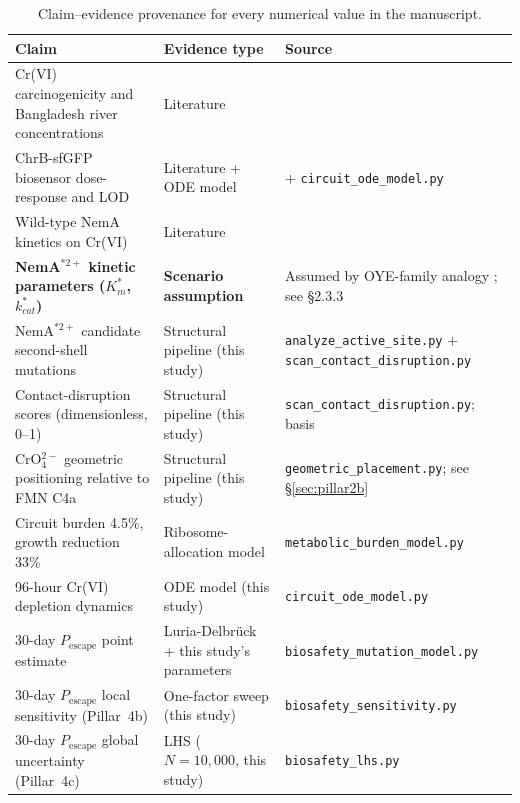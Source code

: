 \documentclass[10pt,twocolumn,letterpaper,
              colorlinks=true,
              linkcolor=blue!70!black,
              citecolor=blue!70!black,
              urlcolor=blue!70!black,
              pdfborder={0 0 0}]{article}
\begin{document}
\begin{table}[!t]
\centering
\caption{Claim--evidence provenance for every numerical value in the
  manuscript.}
\label{tab:provenance}
\small
\begin{tabular}{@{}p{4.5cm} p{3.2cm} p{8.0cm}@{}}
\toprule
\textbf{Claim} & \textbf{Evidence type} & \textbf{Source} \\
\midrule
Cr(VI) carcinogenicity and Bangladesh river concentrations
  & Literature
  & \cite{iarc1990,rahman2021,ahmed2022,islam2020,doem2022} \\[2pt]
ChrB-sfGFP biosensor dose-response and LOD
  & Literature + ODE model
  & \cite{igem2013} + \texttt{circuit\_ode\_model.py} \\[2pt]
Wild-type NemA kinetics on Cr(VI)
  & Literature
  & \cite{williams2003} \\[2pt]
\textbf{NemA$^{*2+}$ kinetic parameters ($K_m^*$, $k_{cat}^*$)}
  & \textbf{Scenario assumption}
  & Assumed by OYE-family analogy \cite{mowafy2010}; see \S2.3.3 \\[2pt]
NemA$^{*2+}$ candidate second-shell mutations
  & Structural pipeline (this study)
  & \texttt{analyze\_active\_site.py} +
    \texttt{scan\_contact\_disruption.py} \\[2pt]
Contact-disruption scores (dimensionless, 0--1)
  & Structural pipeline (this study)
  & \texttt{scan\_contact\_disruption.py}; basis \cite{kannan1999} \\[2pt]
CrO$_4^{2-}$ geometric positioning relative to FMN C4a
  & Structural pipeline (this study)
  & \texttt{geometric\_placement.py}; see \S\ref{sec:pillar2b} \\[2pt]
Circuit burden 4.5\%, growth reduction 33\%
  & Ribosome-allocation model
  & \texttt{metabolic\_burden\_model.py} \\[2pt]
96-hour Cr(VI) depletion dynamics
  & ODE model (this study)
  & \texttt{circuit\_ode\_model.py} \\[2pt]
30-day $P_{\text{escape}}$ point estimate
  & Luria-Delbr\"{u}ck + this study's parameters
  & \texttt{biosafety\_mutation\_model.py} \\[2pt]
30-day $P_{\text{escape}}$ local sensitivity (Pillar~4b)
  & One-factor sweep (this study)
  & \texttt{biosafety\_sensitivity.py} \\[2pt]
30-day $P_{\text{escape}}$ global uncertainty (Pillar~4c)
  & LHS ($N = 10{,}000$, this study)
  & \texttt{biosafety\_lhs.py} \\
\bottomrule
\end{tabular}
\end{table}
\end{document}
